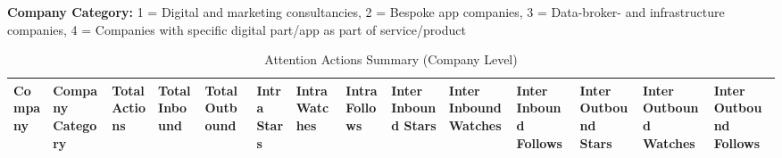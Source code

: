 \begin{ThreePartTable}
\begin{TableNotes}
\footnotesize
\item \textbf{Company Category:} 1 = Digital and marketing consultancies, 2 = Bespoke app companies, 3 = Data-broker- and infrastructure companies, 4 = Companies with specific digital part/app as part of service/product
\end{TableNotes}

\footnotesize

\begin{longtable}[htbp]{>{\raggedright\arraybackslash}p{1.3cm} >{\centering\arraybackslash}p{1.3cm} >{\centering\arraybackslash}p{1cm} >{\centering\arraybackslash}p{1cm} >{\centering\arraybackslash}p{1cm} >{\centering\arraybackslash}p{1cm} >{\centering\arraybackslash}p{1cm} >{\centering\arraybackslash}p{1cm} >{\centering\arraybackslash}p{1cm} >{\centering\arraybackslash}p{1cm} >{\centering\arraybackslash}p{1cm} >{\centering\arraybackslash}p{1cm} >{\centering\arraybackslash}p{1cm} >{\centering\arraybackslash}p{1cm}}
\caption{Attention Actions Summary (Company Level)} \label{tab:attention_summary} \\
\textbf{\textbf{Company}} & \textbf{\textbf{Company Category}} & \textbf{\textbf{Total Actions}} & \textbf{\textbf{Total Inbound}} & \textbf{\textbf{Total Outbound}} & \textbf{\textbf{Intra Stars}} & \textbf{\textbf{Intra Watches}} & \textbf{\textbf{Intra Follows}} & \textbf{\textbf{Inter Inbound Stars}} & \textbf{\textbf{Inter Inbound Watches}} & \textbf{\textbf{Inter Inbound Follows}} & \textbf{\textbf{Inter Outbound Stars}} & \textbf{\textbf{Inter Outbound Watches}} & \textbf{\textbf{Inter Outbound Follows}} \\
\midrule
\endfirsthead


\end{longtable}
\end{ThreePartTable}
